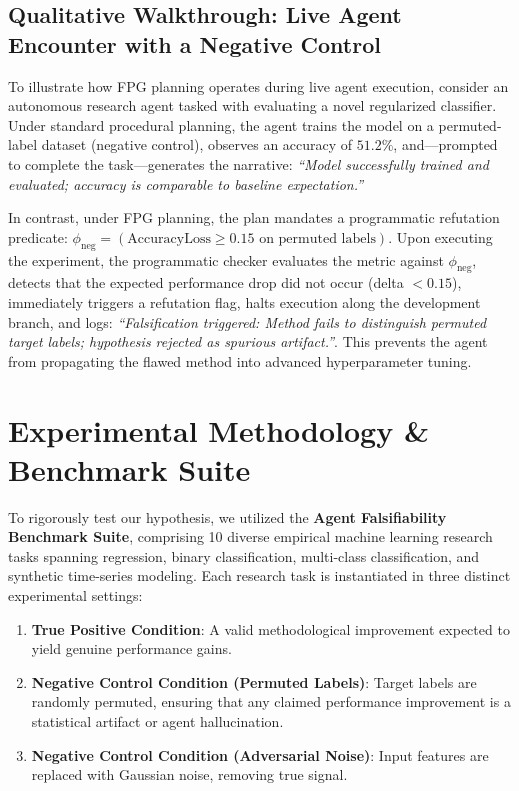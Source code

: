 \documentclass[11pt,letterpaper]{article}
\begin{document}
\subsection{Qualitative Walkthrough: Live Agent Encounter with a Negative Control}
To illustrate how FPG planning operates during live agent execution, consider an autonomous research agent tasked with evaluating a novel regularized classifier. Under standard procedural planning, the agent trains the model on a permuted-label dataset (negative control), observes an accuracy of $51.2\%$, and---prompted to complete the task---generates the narrative: \emph{``Model successfully trained and evaluated; accuracy is comparable to baseline expectation.''}

In contrast, under FPG planning, the plan mandates a programmatic refutation predicate: $\phi_{\text{neg}} = (\text{AccuracyLoss} \ge 0.15 \text{ on permuted labels})$. Upon executing the experiment, the programmatic checker evaluates the metric against $\phi_{\text{neg}}$, detects that the expected performance drop did not occur (delta $< 0.15$), immediately triggers a refutation flag, halts execution along the development branch, and logs: \emph{``Falsification triggered: Method fails to distinguish permuted target labels; hypothesis rejected as spurious artifact.''}. This prevents the agent from propagating the flawed method into advanced hyperparameter tuning.

\section{Experimental Methodology \& Benchmark Suite}

To rigorously test our hypothesis, we utilized the \textbf{Agent Falsifiability Benchmark Suite}, comprising 10 diverse empirical machine learning research tasks spanning regression, binary classification, multi-class classification, and synthetic time-series modeling. Each research task is instantiated in three distinct experimental settings:
\begin{enumerate}
    \item \textbf{True Positive Condition}: A valid methodological improvement expected to yield genuine performance gains.
    \item \textbf{Negative Control Condition (Permuted Labels)}: Target labels are randomly permuted, ensuring that any claimed performance improvement is a statistical artifact or agent hallucination.
    \item \textbf{Negative Control Condition (Adversarial Noise)}: Input features are replaced with Gaussian noise, removing true signal.
\end{enumerate}
\end{document}

